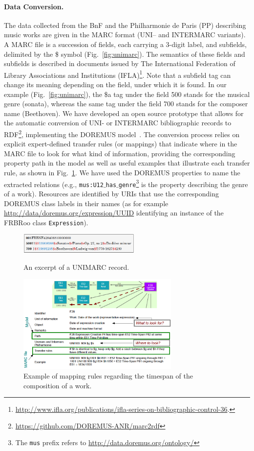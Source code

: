 \documentclass[runningheads,a4paper]{llncs}
\begin{document}
\paragraph{{\bf Data Conversion.}} The data collected from the BnF and the Philharmonie de Paris (PP) describing music works are given in the MARC format (UNI-- and INTERMARC variants). A MARC file is a succession of fields, each carrying a 3-digit label, and subfields, delimited by the \$ symbol (Fig.~\ref{fig:unimarc}). The semantics of these fields and subfields is described in documents issued by The International Federation of Library Associations and Institutions (IFLA)\footnote{\url{http://www.ifla.org/publications/ifla-series-on-bibliographic-control-36}.}. Note that a subfield tag can change its meaning depending on the field, under which it is found. In our example (Fig.~\ref{fig:unimarc}), the \$a tag under the field 500 stands for the musical genre (sonata), whereas the same tag under the field 700 stands for the composer name (Beethoven). We have developed an open source prototype that allows for the automatic conversion of UNI- or INTERMARC bibliographic records to RDF\footnote{\url{https://github.com/DOREMUS-ANR/marc2rdf}}, implementing the DOREMUS model~\cite{choffe2016doremus}. The conversion process relies on explicit expert-defined transfer rules (or mappings) that indicate where in the MARC file to look for what kind of information, providing the corresponding property path in the model as well as useful examples that illustrate each transfer rule, as shown in Fig.~\ref{fig:mappings}. We have used the DOREMUS properties to name the extracted relations (e.g., \texttt{mus:U12$\_$has$\_$genre}\footnote{The \texttt{mus} prefix refers to \url{http://data.doremus.org/ontology/}} is the property describing the genre of a work). Resources are identified by URIs that use the corresponding DOREMUS class labels in their names (as for example \url{http://data/doremus.org/expression/UUID} identifying an instance of the FRBRoo class \texttt{Expression}).
\begin{figure}
  \centering
  \includegraphics[width=6cm]{img/marc-exmpl-simple.png}
  \caption{An excerpt of a UNIMARC record.}
  \label{fig:unimarc}
\smallskip
  \centering
  \includegraphics[width=8cm]{img/mapping-rules.png}
  \caption{Example of mapping rules regarding the timespan of the composition of a work.}
  \label{fig:mappings}
\end{figure}
\end{document}
